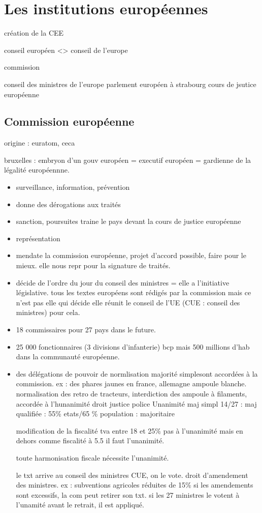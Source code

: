 \documentclass[a4paper,12pt]{article}
\begin{document}
\section{Les institutions européennes}

création de la CEE

conseil européen <> conseil de l'europe

commission

conseil des ministres de l'europe
parlement européen à strabourg
cours de jsutice européenne


\subsection{Commission européenne}
origine : euratom, ceca

bruxelles : embryon d'un gouv européen = executif européen =
gardienne de la légalité européennne.

\begin{itemize}
	\item surveillance, information, prévention
	\item donne des dérogations aux traités
	\item sanction, poursuites  traine le pays devant la cours de justice européenne
	\item représentation
	\item mendate la commission européenne, projet d'accord possible, faire pour le mieux.
	elle nous repr pour la signature de traités.
	\item décide de l'ordre du jour du conseil des ministres = elle a l'initiative législative.
	tous les textes européens sont rédigés par la commission mais ce n'est pas elle qui décide
	elle réunit le conseil de l'UE (CUE : conseil des ministres) pour cela.
	\item 18 commissaires pour 27 pays dans le future.
	\item 25 000 fonctionnaires (3 divisions d'infanterie) bcp mais 500 millions d'hab dans la communauté européenne.
	\item des délégations de pouvoir de normlisation majorité simplesont accordées à la commission.
	ex : des phares jaunes en france, allemagne ampoule blanche. normalisation des retro de tracteurs, interdiction
	des ampoule à filaments, accordée à l'hunanimité  
	droit justice police
	Unanimité
	maj simpl 14/27 : 
	maj qualifiée : 55\% etats/65 \% population  : majoritaire
	
	modification de la fiscalité  tva entre 18 et 25\% pas à l'unanimité
	mais en dehors comme fiscalité à 5.5 il faut l'unanimité.
	
	toute harmonisation fiscale nécessite l'unanimité.
	
	le txt arrive au conseil des ministres CUE, on le vote.
	droit d'amendement des ministres.
	ex : subventions agricoles réduites de 15\% 
	si les amendements sont excessifs, la com peut retirer son txt.
	si les 27 ministres le votent à l'unamité avant le retrait, il est appliqué.
\end{itemize}
\end{document}

